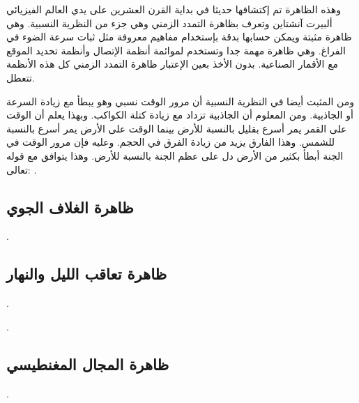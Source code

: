وهذه الظاهرة تم إكتشافها حديثا في بداية القرن العشرين على يدي العالم الفيزيائي ألبيرت آنشتاين وتعرف بظاهرة التمدد الزمني وهي جزء من النظرية النسبية. وهي ظاهرة مثبتة ويمكن حسابها بدقة بإستخدام مفاهيم معروفة مثل ثبات سرعة الضوء في الفراغ. وهي ظاهرة مهمة جدا وتستخدم لموائمة أنظمة الإتصال وأنظمة تحديد الموقع مع الأقمار الصناعية. بدون الأخذ بعين الإعتبار ظاهرة التمدد الزمني كل هذه الأنظمة تتعطل.

ومن المثبت أيضا في النظرية النسبية أن مرور الوقت نسبي وهو يبطأ مع زيادة السرعة أو الجاذبية. ومن المعلوم أن الجاذبية تزداد مع زيادة كتلة الكواكب. وبهذا يعلم أن الوقت على القمر يمر أسرع بقليل بالنسبة للأرض بينما الوقت على الأرض يمر أسرع بالنسبة للشمس. وهذا الفارق يزيد من زيادة الفرق في الحجم. وعليه فإن مرور الوقت في الجنة أبطأ بكثير من الأرض دل على عظم الجنة بالنسبة للأرض. وهذا يتوافق مع قوله تعالى:
\quranayah*[3][133]{\footnotesize \surahname*[3]}.




\subsection{ظاهرة الغلاف الجوي}

\quranayah*[36][36-40]{\footnotesize \surahname*[36]}.


\subsection{ظاهرة تعاقب الليل والنهار}

\quranayah*[3][27]{\footnotesize \surahname*[3]}.

\quranayah*[24][44]{\footnotesize \surahname*[24]}.


\subsection{ظاهرة المجال المغنطيسي}

\quranayah*[21][32]{\footnotesize \surahname*[21]}.


